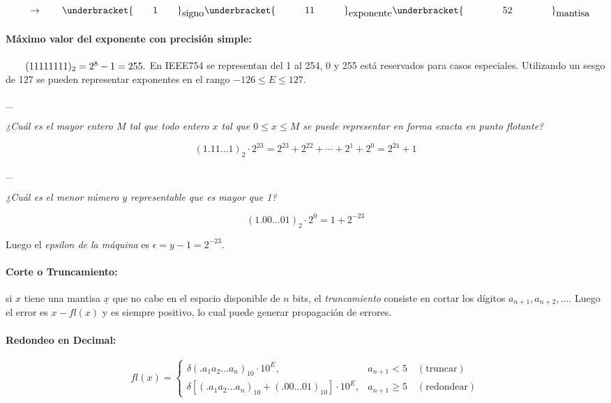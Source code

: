 \(\;\, \qquad\rightarrow \qquad\underbracket{\hbox{\qquad1\qquad}}_{\hbox{signo}} \underbracket{\hbox{\quad\qquad11\quad\qquad}}_{\hbox{exponente}} \underbracket{\hbox{\qquad\qquad52\qquad\qquad}}_{\hbox{mantisa}}\)

\hypertarget{muxe1ximo-valor-del-exponente-con-precisiuxf3n-simple}{%
\paragraph{Máximo valor del exponente con precisión
simple:}\label{muxe1ximo-valor-del-exponente-con-precisiuxf3n-simple}}

\(\qquad (11111111)_2 = 2^8-1 = 255.\\\) En IEEE754 se representan del 1
al 254, 0 y 255 está reservados para casos especiales. Utilizando un
sesgo de 127 se pueden representar exponentes en el rango
\(-126 \leq E \leq 127\).

\_

\emph{¿Cuál es el mayor entero \(M\) tal que todo entero \(x\) tal que
\(0 \leq x \leq M\) se puede representar en forma exacta en punto
flotante?}

\[
(1.11...1)_2 \cdot 2^{23} = 2^{23} + 2^{22} + \cdots + 2^1 + 2^0 = 2^{24} + 1
\]

\_

\emph{¿Cuál es el menor número \(y\) representable que es mayor que 1?}

\[
(1.00...01)_2 \cdot 2^0 = 1 + 2^{-23}
\]

Luego el \emph{epsilon de la máquina} es \(\epsilon = y - 1 = 2^{-23}\).

\hypertarget{corte-o-truncamiento}{%
\paragraph{Corte o Truncamiento:}\label{corte-o-truncamiento}}

si \(x\) tiene una mantisa \(\underline{x}\) que no cabe en el espacio
disponible de \(n\) bits, el \emph{truncamiento} consiste en cortar los
dígitos \(a_{n+1}, a_{n+2}, ...\). Luego el error es \(x - fl(x)\) y es
siempre positivo, lo cual puede generar propagación de errores.

\hypertarget{redondeo-en-decimal}{%
\paragraph{Redondeo en Decimal:}\label{redondeo-en-decimal}}

\[
fl(x)=
\begin{cases}
\delta(. a_1 a_2 ... a_n)_{10} \cdot 10^E, & a_{n+1} < 5 \quad(\text{truncar})\\ 
\delta [(. a_1 a_2 ... a_n)_{10} + (.0 0 ... 0 1)_{10} ] 
  \cdot 10^E, & a_{n+1} \geq 5 \quad(\text{redondear})
\end{cases}
\]

